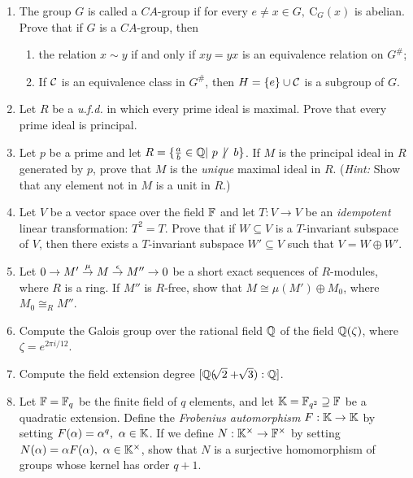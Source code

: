 \begin{Large}
\begin{enumerate}
\item The group $G$ is called a $CA$-group if for every $e\not= x\in G,\ 
\mbox{C}_G(x)$ is abelian. Prove that if $G$ is a $CA$-group, then
\begin{enumerate}
\item the relation $x\sim y$ if and only if 
$xy=yx$ is an equivalence relation on $G^\#$;
\item If $\cal C$ is an equivalence class in $G^\#$, then $H=
\{e\}\cup\cal C$ is a subgroup of $G$.
\end{enumerate}

\item Let $R$ be a {\em u.f.d.} in which every prime ideal is maximal.
Prove that every prime ideal is principal.

\item Let $p$ be a prime and let $R=\{\frac{a}{b}\in {{\Bbb Q}}|\
p\not\kern -0.1em\vert\ \  b\}$.  If $M$ is the principal ideal in $R$ generated
 by $p$,
prove that $M$ is the {\em unique} maximal ideal in $R$. ({\em Hint:} Show
that any element not in $M$ is a unit in $R$.)

\item Let $V$ be a vector space over the field ${{\Bbb F}}$ and let 
$T:V\to V$ be an {\em idempotent} linear transformation: $T^2=T$.
Prove that if $W\subseteq V$ is a $T$-invariant subspace of $V$, then
there exists a $T$-invariant subspace $W'\subseteq V$ such that
$V=W\oplus W'$.


\item Let $0\rightarrow M'\buildrel\mu\over\rightarrow 
M\buildrel\epsilon\over\rightarrow M''\rightarrow 0$ be a short exact 
sequences of $R$-modules, where $R$ is a ring. If $M''$ is $R$-free,
show that $M\cong \mu (M')\oplus M_0$, where $M_0\cong_RM''$.

\item Compute the Galois group over the rational field ${{\Bbb Q}}$ of 
the field ${{\Bbb Q}}(\zeta )$, where $\zeta = e^{2\pi i/12}$.

\item Compute the field extension degree $[{\Q}(\root\of{2}+\root\of{3})
:{\Q}]$.

\item Let ${{\Bbb F}}={\Bbb F}_q$ be the finite field of $q$ elements, and let
${\Bbb K}={\Bbb F}_{q^2}\supseteq {\Bbb F}$ be a quadratic extension. Define the
{\em Frobenius automorphism} $F:{\Bbb K}\to {\Bbb K}$ by setting $F(\alpha )=\alpha^q,
\ \alpha\in{\Bbb K}$. If we define $N:{\Bbb K}^\times\to{\Bbb F}^\times $ by setting
$N(\alpha )=\alpha F(\alpha ),\ \alpha\in\K^\times$, show that $N$ is
a surjective homomorphism of groups whose kernel has order $q+1$. 



    
\end{enumerate}
\end{Large} 


















